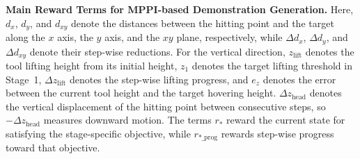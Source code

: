 \begin{table}[!h]
\centering
\caption{\textbf{Main Reward Terms for MPPI-based Demonstration Generation.}
Here, $d_x$, $d_y$, and $d_{xy}$ denote the distances between the hitting point and the target along the $x$ axis, the $y$ axis, and the $xy$ plane, respectively, while $\Delta d_x$, $\Delta d_y$, and $\Delta d_{xy}$ denote their step-wise reductions.
For the vertical direction, $z_{\mathrm{lift}}$ denotes the tool lifting height from its initial height, $z_1$ denotes the target lifting threshold in Stage~1, $\Delta z_{\mathrm{lift}}$ denotes the step-wise lifting progress, and $e_z$ denotes the error between the current tool height and the target hovering height.
$\Delta z_{\mathrm{head}}$ denotes the vertical displacement of the hitting point between consecutive steps, so $-\Delta z_{\mathrm{head}}$ measures downward motion.
The terms $r_\ast$ reward the current state for satisfying the stage-specific objective, while $r_{\ast\_\mathrm{prog}}$ rewards step-wise progress toward that objective.}


\end{table}
